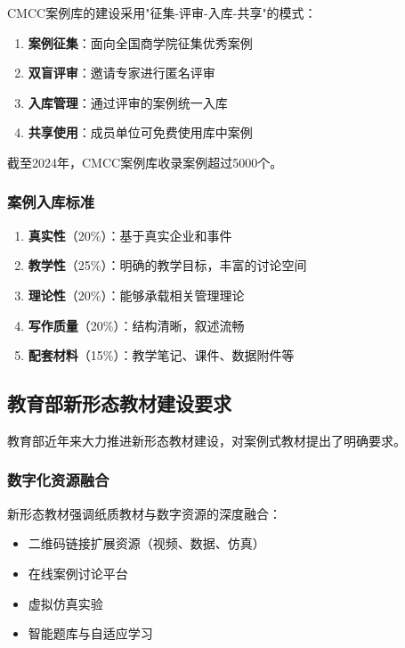 \documentclass[12pt,a4paper]{ctexart}
\begin{document}
CMCC案例库的建设采用"征集-评审-入库-共享"的模式：

\begin{enumerate}[leftmargin=2em]
    \item \textbf{案例征集}：面向全国商学院征集优秀案例
    \item \textbf{双盲评审}：邀请专家进行匿名评审
    \item \textbf{入库管理}：通过评审的案例统一入库
    \item \textbf{共享使用}：成员单位可免费使用库中案例
\end{enumerate}

截至2024年，CMCC案例库收录案例超过5000个。

\subsubsection{案例入库标准}

\begin{methodbox}[CMCC案例入库评审标准]
\begin{enumerate}[leftmargin=2em]
    \item \textbf{真实性}（20\%）：基于真实企业和事件
    \item \textbf{教学性}（25\%）：明确的教学目标，丰富的讨论空间
    \item \textbf{理论性}（20\%）：能够承载相关管理理论
    \item \textbf{写作质量}（20\%）：结构清晰，叙述流畅
    \item \textbf{配套材料}（15\%）：教学笔记、课件、数据附件等
\end{enumerate}
\end{methodbox}

\subsection{教育部新形态教材建设要求}

教育部近年来大力推进新形态教材建设，对案例式教材提出了明确要求。

\subsubsection{数字化资源融合}

新形态教材强调纸质教材与数字资源的深度融合：
\begin{itemize}[leftmargin=2em]
    \item 二维码链接扩展资源（视频、数据、仿真）
    \item 在线案例讨论平台
    \item 虚拟仿真实验
    \item 智能题库与自适应学习
\end{itemize}
\end{document}
